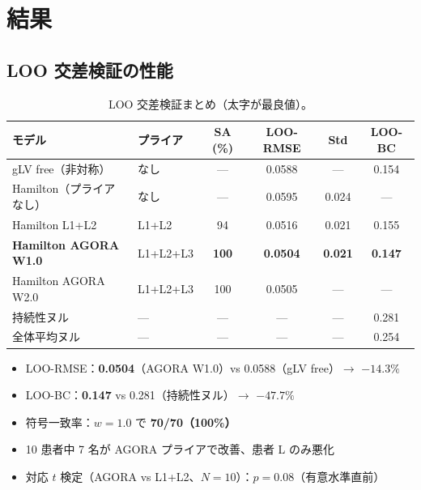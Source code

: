 \documentclass[10pt,a4paper]{article}
\begin{document}
\section{結果}

\subsection{LOO 交差検証の性能}

\begin{table}[H]
\centering\small
\caption{LOO 交差検証まとめ（太字が最良値）。}
\label{tab:loo}
\begin{tabular}{llcccc}
\toprule
モデル & プライア & SA (\%) & LOO-RMSE & Std & LOO-BC \\
\midrule
gLV free（非対称）               & なし       & ---    & 0.0588 & ---   & 0.154 \\
Hamilton（プライアなし）          & なし       & ---    & 0.0595 & 0.024 & ---   \\
Hamilton L1+L2                   & L1+L2      & 94     & 0.0516 & 0.021 & 0.155 \\
\textbf{Hamilton AGORA W1.0}     & L1+L2+L3   & \textbf{100} & \textbf{0.0504} & \textbf{0.021} & \textbf{0.147} \\
Hamilton AGORA W2.0              & L1+L2+L3   & 100    & 0.0505 & ---   & ---   \\
\midrule
持続性ヌル                       & ---        & ---    & ---    & ---   & 0.281 \\
全体平均ヌル                     & ---        & ---    & ---    & ---   & 0.254 \\
\bottomrule
\end{tabular}
\end{table}

\begin{keybox}[数値まとめ]
\begin{itemize}[noitemsep]
  \item LOO-RMSE：\textbf{0.0504}（AGORA W1.0）vs 0.0588（gLV free）$\to$ $\mathbf{-14.3\%}$
  \item LOO-BC：\textbf{0.147} vs 0.281（持続性ヌル）$\to$ $\mathbf{-47.7\%}$
  \item 符号一致率：$w=1.0$ で \textbf{70/70（100\%）}
  \item 10 患者中 7 名が AGORA プライアで改善、患者 L のみ悪化
  \item 対応 $t$ 検定（AGORA vs L1+L2、$N=10$）：$p=0.08$（有意水準直前）
\end{itemize}
\end{keybox}
\end{document}
